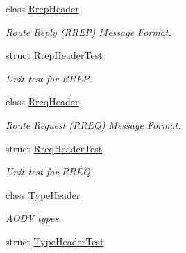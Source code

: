 \begin{DoxyCompactItemize}
class \hyperlink{classns3_1_1aodv_1_1RrepHeader}{Rrep\+Header}
\begin{DoxyCompactList}\small\item\em Route Reply (R\+R\+EP) Message Format. \end{DoxyCompactList}\item 
struct \hyperlink{structns3_1_1aodv_1_1RrepHeaderTest}{Rrep\+Header\+Test}
\begin{DoxyCompactList}\small\item\em Unit test for R\+R\+EP. \end{DoxyCompactList}\item 
class \hyperlink{classns3_1_1aodv_1_1RreqHeader}{Rreq\+Header}
\begin{DoxyCompactList}\small\item\em Route Request (R\+R\+EQ) Message Format. \end{DoxyCompactList}\item 
struct \hyperlink{structns3_1_1aodv_1_1RreqHeaderTest}{Rreq\+Header\+Test}
\begin{DoxyCompactList}\small\item\em Unit test for R\+R\+EQ. \end{DoxyCompactList}\item 
class \hyperlink{classns3_1_1aodv_1_1TypeHeader}{Type\+Header}
\begin{DoxyCompactList}\small\item\em A\+O\+DV types. \end{DoxyCompactList}\item 
struct \hyperlink{structns3_1_1aodv_1_1TypeHeaderTest}{Type\+Header\+Test}
\end{DoxyCompactItemize}
